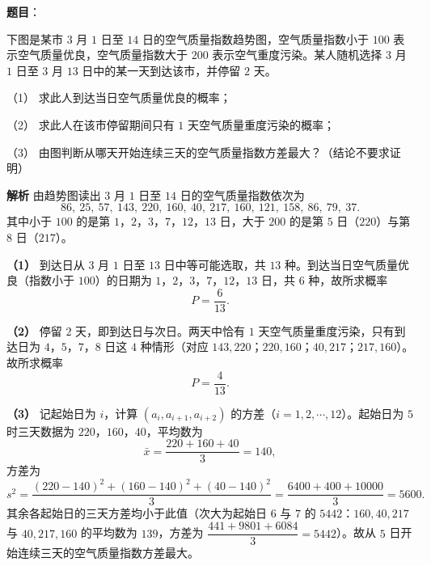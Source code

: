 \begin{answer}

\textbf{题目}：

下图是某市 $3$ 月 $1$ 日至 $14$ 日的空气质量指数趋势图，空气质量指数小于 $100$ 表示空气质量优良，空气质量指数大于 $200$ 表示空气重度污染。某人随机选择 $3$ 月 $1$ 日至 $3$ 月 $13$ 日中的某一天到达该市，并停留 $2$ 天。
\nopagebreak[4]
\begin{center}\end{center}
\nopagebreak[4]
（1） 求此人到达当日空气质量优良的概率；

（2） 求此人在该市停留期间只有 $1$ 天空气质量重度污染的概率；

（3） 由图判断从哪天开始连续三天的空气质量指数方差最大？（结论不要求证明）

\textbf{解析}
由趋势图读出 $3$ 月 $1$ 日至 $14$ 日的空气质量指数依次为
\nopagebreak[4]
\[86,\ 25,\ 57,\ 143,\ 220,\ 160,\ 40,\ 217,\ 160,\ 121,\ 158,\ 86,\ 79,\ 37.\]
其中小于 $100$ 的是第 $1$，$2$，$3$，$7$，$12$，$13$ 日，大于 $200$ 的是第 $5$ 日（$220$）与第 $8$ 日（$217$）。

\textbf{（1）} 到达日从 $3$ 月 $1$ 日至 $13$ 日中等可能选取，共 $13$ 种。到达当日空气质量优良（指数小于 $100$）的日期为 $1$，$2$，$3$，$7$，$12$，$13$ 日，共 $6$ 种，故所求概率
\nopagebreak[4]
\[P=\frac6{13}.\]

\textbf{（2）} 停留 $2$ 天，即到达日与次日。两天中恰有 $1$ 天空气质量重度污染，只有到达日为 $4$，$5$，$7$，$8$ 日这 $4$ 种情形（对应 $143,220$；$220,160$；$40,217$；$217,160$）。故所求概率
\nopagebreak[4]
\[P=\frac4{13}.\]

\textbf{（3）} 记起始日为 $i$，计算 $(a_i,a_{i+1},a_{i+2})$ 的方差（$i=1,2,\cdots,12$）。起始日为 $5$ 时三天数据为 $220$，$160$，$40$，平均数为
\nopagebreak[4]
\[\bar x=\frac{220+160+40}3=140,\]
方差为
\nopagebreak[4]
\[s^2=\frac{(220-140)^2+(160-140)^2+(40-140)^2}3=\frac{6400+400+10000}3=5600.\]
其余各起始日的三天方差均小于此值（次大为起始日 $6$ 与 $7$ 的 $5442$：$160,40,217$ 与 $40,217,160$ 的平均数为 $139$，方差为 $\dfrac{441+9801+6084}3=5442$）。故从 $5$ 日开始连续三天的空气质量指数方差最大。




\end{answer}

